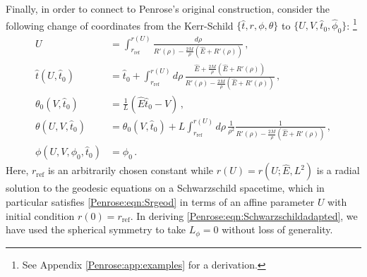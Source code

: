 
Finally, in order to connect to Penrose's original construction, consider the following change of coordinates  from the Kerr-Schild  $\lbrace \hat{t},r,\phi,\theta \rbrace$  to $\lbrace U,V,\hat{t}_0,\hat{\phi}_0 \rbrace$: \footnote{See Appendix \ref{Penrose:app:examples} for a derivation.}
\begin{equation}\label{Penrose:eqn:Schwarzschildadapted}
\begin{aligned}
U &= \int^{r(U)}_{r_{\mathrm{ref}}} \frac{d\rho}{R'(\rho) -\frac{2M}{\rho} \left(\hat{E}+R'(\rho)\right)}   \, , \\ 
\hat{t}(U,\hat{t}_0) &= \hat{t}_0 + \int^{r(U)}_{r_{\mathrm{ref}}} d\rho \, \frac{\hat{E}+\frac{2M}{\rho} \left(\hat{E}+ R'(\rho)\right)}{R'(\rho) -\frac{2M}{\rho} \left(\hat{E}+R'(\rho)\right)} \, , \\
\theta_0(V,\hat{t}_0) &= \frac{1}{L}\left(\hat{E}\hat{t}_0  - V\right) \, , \\
\theta(U,V, \hat{t}_0) &= \theta_0(V,\hat{t}_0)+ L\int^{r(U)}_{r_{\mathrm{ref}}} d\rho \, \frac{1}{\rho^2}\frac{1}{R'(\rho) -\frac{2M}{\rho} \left(\hat{E}+R'(\rho)\right)} \, ,\\
\phi(U,V,\phi_0,\hat{t}_0) &= \phi_0  \, .
\end{aligned}
\end{equation}
Here, $r_{\mathrm{ref}}$ is an arbitrarily chosen constant while $r(U) = r(U;\hat{E},L^2)$ is a radial solution to
the geodesic equations on a Schwarzschild spacetime, which in particular satisfies \eqref{Penrose:eqn:Srgeod} in
terms of an affine parameter $U$ with initial condition $r(0) = r_{\mathrm{ref}}$. In deriving \eqref{Penrose:eqn:Schwarzschildadapted}, we have used the spherical symmetry to take $L_{\phi} = 0$ without loss of generality. 

